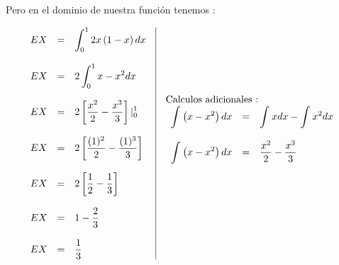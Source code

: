 \documentclass[12pt]{article}
\begin{document}
    
    \begin{flushleft}
        Pero en el dominio de nuestra funci\'on tenemos : 
    \end{flushleft}
      
    \begin{center}
        \begin{equation*}
            \begin{array}{c|c}
                \begin{array}{rcl}
                    EX & = & \displaystyle\int_{0}^{1}2x \left(1-x\right) dx
                    \\
                    \\
                    EX & = &  2 \displaystyle\int_{0}^{1}x - x^2 dx
                    \\
                    \\
                    EX & = & \displaystyle 2\left[\frac{x^2}{2}- \frac{x^3}{3}\right]\vert_{0}^{1}
                    \\
                    \\
                    EX & = & \displaystyle 2\left[\frac{(1)^2}{2}- \frac{(1)^3}{3}\right]
                    \\
                    \\
                    EX & = & \displaystyle 2\left[\frac{1}{2}- \frac{1}{3}\right]
                    \\
                    \\
                    EX & = & \displaystyle 1-\frac{2}{3}
                    \\
                    \\
                    EX & = & \displaystyle \frac{1}{3}
                \end{array}
                &
                \begin{array}{l}
                    \mbox{Calculos adicionales :}
                    \\
                    \begin{array}{rcl}
                        \displaystyle \int_{}^{}\left(x-x^2\right)dx & = & \displaystyle\int_{}^{}x dx - \int_{}^{}x^2 dx
                        \\
                        \\
                        \displaystyle\int_{}^{}\left(x-x^2\right)dx & = & \displaystyle\frac{x^2}{2} - \frac{x^3}{3}
                        \vspace{1cm}
                        \\

\end{array}
\end{array}
\end{array}
\end{equation*}
\end{center}
\end{document}
